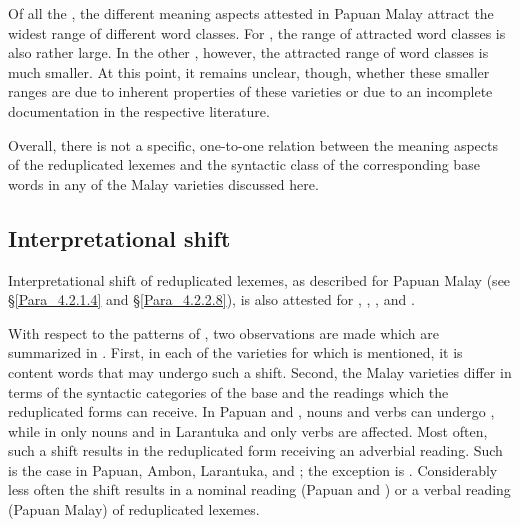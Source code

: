 {\begin{table}[b]
\end{table}



Of all the , the different meaning aspects attested in Papuan Malay attract the widest range of different word classes. For , the range of attracted word classes is also rather large. In the other , however, the attracted range of word classes is much smaller. At this point, it remains unclear, though, whether these smaller ranges are due to inherent properties of these varieties or due to an incomplete documentation in the respective literature.


Overall, there is not a specific, one-to-one relation between the meaning aspects of the reduplicated lexemes and the syntactic class of the corresponding base words in any of the Malay varieties discussed here.


\subsection{Interpretational shift}
\label{Para_4.3.3}
Interpretational shift of reduplicated lexemes, as described for Papuan Malay (see §\ref{Para_4.2.1.4} and §\ref{Para_4.2.2.8}), is also attested for  \citep[118, 123, 125]{vanMinde.1997},  \citep[126, 270]{Paauw.2009},  {\citep[26]{Stoel.2005}}, and  {\citep[220]{Litamahuputty.2012}}.



With respect to the patterns of , two observations are made which are summarized in . First, in each of the varieties for which  is mentioned, it is content words that may undergo such a shift. Second, the Malay varieties differ in terms of the syntactic categories of the base and the readings which the reduplicated forms can receive. In Papuan and , nouns and verbs can undergo , while in  only nouns and in Larantuka and  only verbs are affected. Most often, such a shift results in the reduplicated form receiving an adverbial reading. Such is the case in Papuan, Ambon, Larantuka, and ; the exception is . Considerably less often the shift results in a nominal reading (Papuan and ) or a verbal reading (Papuan Malay) of reduplicated lexemes.


}
